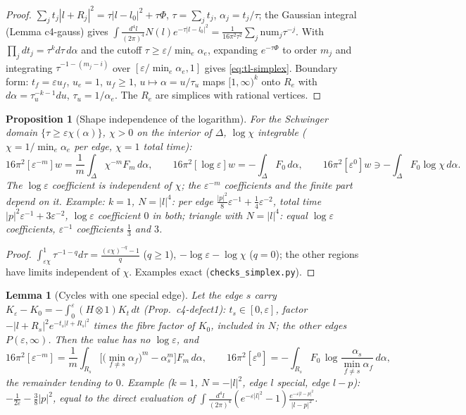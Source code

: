 \documentclass[11pt]{article}
\numberwithin{equation}{section}
\theoremstyle{plain}
\newtheorem{proposition}[theorem]{Proposition}
\newtheorem{lemma}[theorem]{Lemma}
\theoremstyle{definition}
\begin{document}
\begin{proof}
$\sum_jt_j|l+R_j|^2=\tau|l-l_0|^2+\tau\Phi$, $\tau=\sum_jt_j$, $\alpha_j=t_j/\tau$; the Gaussian integral (Lemma c4-gauss) gives $\int\frac{d^4l}{(2\pi)^4}N(l)e^{-\tau|l-l_0|^2}=\frac{1}{16\pi^2\tau^2}\sum_j\mathrm{num}_j\tau^{-j}$. With $\prod_jdt_j=\tau^kd\tau\,d\alpha$ and the cutoff $\tau\ge\varepsilon/\min_e\alpha_e$, expanding $e^{-\tau\Phi}$ to order $m_j$ and integrating $\tau^{-1-(m_j-i)}$ over $[\varepsilon/\min_e\alpha_e,1]$ gives \eqref{eq:tl-simplex}. Boundary form: $t_f=\varepsilon u_f$, $u_e=1$, $u_f\ge1$, $u\mapsto\alpha=u/\tau_u$ maps $[1,\infty)^k$ onto $R_e$ with $d\alpha=\tau_u^{-k-1}du$, $\tau_u=1/\alpha_e$. The $R_e$ are simplices with rational vertices.
\end{proof}

\begin{proposition}[Shape independence of the logarithm]
\label{prop:tl-shape}
For the Schwinger domain $\{\tau\ge\varepsilon\chi(\alpha)\}$, $\chi>0$ on the interior of $\Delta$, $\log\chi$ integrable ($\chi=1/\min_e\alpha_e$ per edge, $\chi=1$ total time):
\[
16\pi^2[\varepsilon^{-m}]w=\frac1m\int_\Delta\chi^{-m}F_m\,d\alpha,\qquad 16\pi^2[\log\varepsilon]w=-\int_\Delta F_0\,d\alpha,\qquad 16\pi^2[\varepsilon^0]w\ni-\int_\Delta F_0\log\chi\,d\alpha .
\]
The $\log\varepsilon$ coefficient is independent of $\chi$; the $\varepsilon^{-m}$ coefficients and the finite part depend on it. Example: $k=1$, $N=|l|^4$: per edge $\frac{|p|^2}{8}\varepsilon^{-1}+\frac14\varepsilon^{-2}$, total time $|p|^2\varepsilon^{-1}+3\varepsilon^{-2}$, $\log\varepsilon$ coefficient $0$ in both; triangle with $N=|l|^4$: equal $\log\varepsilon$ coefficients, $\varepsilon^{-1}$ coefficients $\frac13$ and $3$.
\end{proposition}

\begin{proof}
$\int_{\varepsilon\chi}^1\tau^{-1-q}d\tau=\frac{(\varepsilon\chi)^{-q}-1}q$ ($q\ge1$), $-\log\varepsilon-\log\chi$ ($q=0$); the other regions have limits independent of $\chi$. Examples exact (\texttt{checks\_simplex.py}).
\end{proof}

\begin{lemma}[Cycles with one special edge]
\label{lem:tl-special}
Let the edge $s$ carry $K_\varepsilon-K_0=-\int_0^\varepsilon(H\otimes1)K_t\,dt$ (Prop.~c4-defect1): $t_s\in[0,\varepsilon]$, factor $-|l+R_s|^2e^{-t_s|l+R_s|^2}$ times the fibre factor of $K_0$, included in $N$; the other edges $P(\varepsilon,\infty)$. Then the value has no $\log\varepsilon$, and
\[
16\pi^2[\varepsilon^{-m}]=\frac1m\int_{R_s}\Big[\big(\min_{f\ne s}\alpha_f\big)^m-\alpha_s^m\Big]F_m\,d\alpha,\qquad 16\pi^2[\varepsilon^0]=-\int_{R_s}F_0\,\log\frac{\alpha_s}{\min_{f\ne s}\alpha_f}\,d\alpha ,
\]
the remainder tending to $0$. Example ($k=1$, $N=-|l|^2$, edge $l$ special, edge $l-p$): $-\frac1{2\varepsilon}-\frac38|p|^2$, equal to the direct evaluation of $\int\frac{d^4l}{(2\pi)^4}(e^{-\varepsilon|l|^2}-1)\frac{e^{-\varepsilon|l-p|^2}}{|l-p|^2}$.
\end{lemma}
\end{document}
